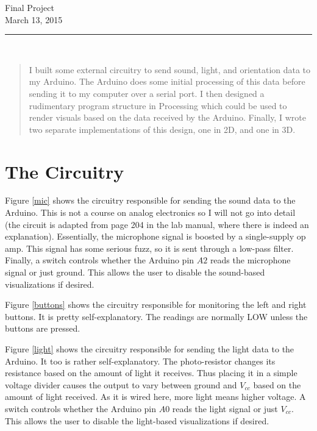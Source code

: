 \documentclass[paper=a4, fontsize=12pt]{scrartcl} 	%
\newcommand{\horrule}[1]{\rule{\linewidth}{#1}} 		%
\begin{document}
\begin{center}
	\huge Final Project\\[0.4cm]
	\small March 13, 2015
	\horrule{0.5pt} \\[0.4cm]
\end{center}


\begin{abstract}
	I built some external circuitry to send sound, light, and orientation data to my Arduino.  The Arduino does some initial processing of this data before sending it to my computer over a serial port.  I then designed a rudimentary program structure in Processing which could be used to render visuals based on the data received by the Arduino.  Finally, I wrote two separate implementations of this design, one in 2D, and one in 3D.
\end{abstract}




\section{The Circuitry}
	Figure \ref{mic} shows the circuitry responsible for sending the sound data to the Arduino.  This is not a course on analog electronics so I will not go into detail (the circuit is adapted from page 204 in the lab manual, where there is indeed an explanation).  Essentially, the microphone signal is boosted by a single-supply op amp.  This signal has some serious fuzz, so it is sent through a low-pass filter.  Finally, a switch controls whether the Arduino pin $A2$ reads the microphone signal or just ground.  This allows the user to disable the sound-based visualizations if desired.
	
	Figure \ref{buttons} shows the circuitry responsible for monitoring the left and right buttons.  It is pretty self-explanatory.  The readings are normally LOW unless the buttons are pressed.
	
	Figure \ref{light} shows the circuitry responsible for sending the light data to the Arduino.  It too is rather self-explanatory.  The photo-resistor changes its resistance based on the amount of light it receives.  Thus placing it in a simple voltage divider causes the output to vary between ground and $V_{cc}$ based on the amount of light received.  As it is wired here, more light means higher voltage.  A switch controls whether the Arduino pin $A0$ reads the light signal or just $V_{cc}$.  This allows the user to disable the light-based visualizations if desired.
	
\end{document}
